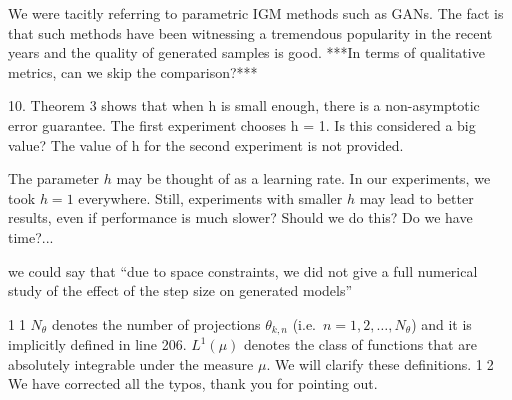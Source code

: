 \documentclass{article}
\newcommand{\rev}[1]{{\color{red} #1}}
\newcommand{\umut}[1]{{\color{blue} #1}}
\newcommand{\alain}[1]{{\color{cyan} #1}}
\newcommand{\antoine}[1]{{\color{orange} #1}}
\newcommand{\ubul}[1]{{\large \color{red} \textcircled{\small #1}}}
\begin{document}
\antoine{We were tacitly referring to parametric IGM methods such as GANs. The fact is that such methods have been witnessing a tremendous popularity in the recent years and the quality of generated samples is good. ***In terms of qualitative metrics, can we skip the comparison?***}

\rev{10. Theorem 3 shows that when h is small enough, there is a non-asymptotic error guarantee. The first experiment chooses h = 1. Is this considered a big value? The value of h for the second experiment is not provided.}

\antoine{The parameter $h$ may be thought of as a learning rate. In our experiments, we took $h=1$ everywhere. Still, experiments with smaller $h$ may lead to better results, even if performance is much slower? Should we do this? Do we have time?...}

\alain{we could say that ``due to space constraints, we did not give a full numerical study of the effect of the step size on generated models''}


\ubul{11} $N_\theta$ denotes the number of projections $\theta_{k,n}$ (i.e.\ $n = 1,2,\dots, N_\theta$) and it is implicitly defined in line 206. $L^1(\mu)$ denotes the class of functions that are absolutely integrable under the measure $\mu$. We will clarify these definitions.
%
%
\ubul{12} We have corrected all the typos, thank you for pointing out.
\end{document}
